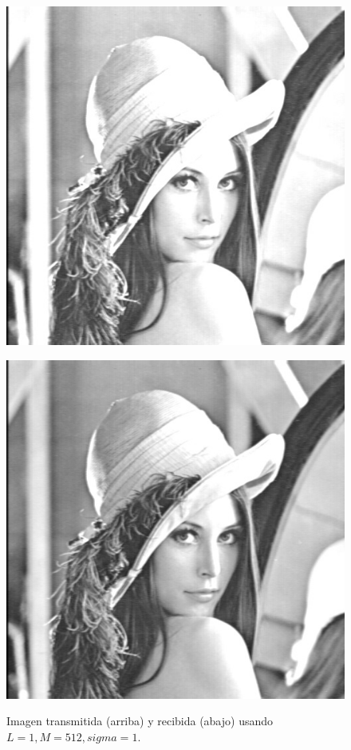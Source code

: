 \documentclass[10pt,journal,compsoc]{IEEEtran}
\begin{document}
\begin{figure}
\begin{center}
\label{fig:refuerzos2}
\centering
\begin{minipage}{.5\textwidth}
  \centering

  \includegraphics[scale=0.25]{../Linterno5/512/1/imgTrans.jpg}
\end{minipage}
\vspace{0cm}
\begin{minipage}{.5\textwidth}
  \centering
  \includegraphics[scale=0.25]{../Linterno5/512/1/imgRec.jpg}
  \label{fig:sub2}
\end{minipage}
\caption{Imagen transmitida (arriba) y recibida (abajo) usando $L=1 , M=512, sigma=1$.}
\label{fig:test}
\end{center}
\end{figure}
\end{document}
